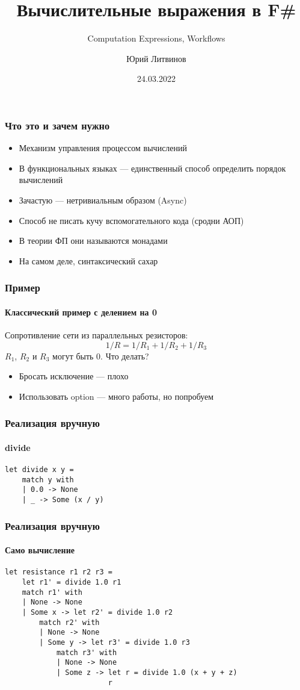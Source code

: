 \documentclass[xetex,mathserif,serif]{beamer}
\title{Вычислительные выражения в F\#}
\subtitle{Computation Expressions, Workflows}
\author{Юрий Литвинов}
\date{24.03.2022}
\begin{document}
    
    \frame{\titlepage}
    
    \begin{frame}
        \frametitle{Что это и зачем нужно}
        \begin{itemize}
            \item Механизм управления процессом вычислений
            \item В функциональных языках --- единственный способ определить порядок вычислений
            \item Зачастую --- нетривиальным образом (Async)
            \item Способ не писать кучу вспомогательного кода (сродни АОП)
            \item В теории ФП они называются монадами
            \item На самом деле, синтаксический сахар
        \end{itemize}
    \end{frame}

    \begin{frame}
        \frametitle{Пример}
        \framesubtitle{Классический пример с делением на 0}
        Сопротивление сети из параллельных резисторов:
        $$1/R = 1/R_1 + 1/R_2 + 1/R_3$$
        $R_1$, $R_2$ и $R_3$ могут быть 0. Что делать?
        \begin{itemize}
            \item Бросать исключение --- плохо
            \item Использовать option --- много работы, но попробуем
        \end{itemize}
    \end{frame}

    \begin{frame}[fragile]
        \frametitle{Реализация вручную}
        \framesubtitle{divide}
        \begin{verbatim}
let divide x y =
    match y with
    | 0.0 -> None
    | _ -> Some (x / y)
        \end{verbatim}
    \end{frame}

    \begin{frame}[fragile]
        \frametitle{Реализация вручную}
        \framesubtitle{Само вычисление}
        \begin{verbatim}
let resistance r1 r2 r3 =
    let r1' = divide 1.0 r1
    match r1' with
    | None -> None
    | Some x -> let r2' = divide 1.0 r2
        match r2' with
        | None -> None
        | Some y -> let r3' = divide 1.0 r3
            match r3' with
            | None -> None
            | Some z -> let r = divide 1.0 (x + y + z)
                        r
        \end{verbatim}
    \end{frame}
\end{document}
